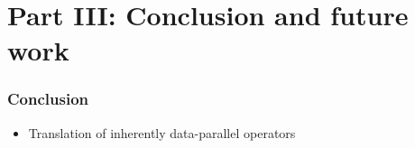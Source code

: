 \section{Part III: Conclusion and future work}

\begin{frame}
  \frametitle{Conclusion}
%
\begin{itemize}
  \item Translation of inherently data-parallel operators
\end{itemize}
%
\end{frame}
